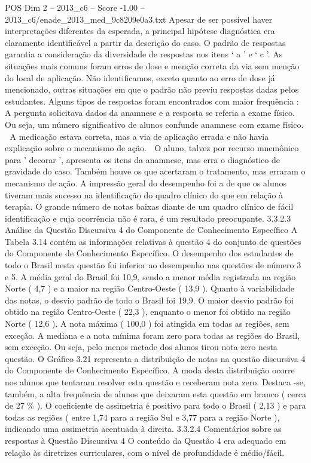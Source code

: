 \begin{textsample}{POS Dim 2 – 2013\_c6 – Score -1.00 – 2013\_c6/enade\_2013\_med\_9c8209e0a3.txt}
Apesar de ser possível haver interpretações diferentes da esperada, a principal hipótese diagnóstica era claramente identificável a partir da descrição do caso.
O padrão de respostas garantia a consideração da diversidade de respostas nos itens ‘ a ’ e ‘ c ’.
As situações mais comuns foram erros de dose e menção correta da via sem menção do local de aplicação.
Não identificamos, exceto quanto ao erro de dose já mencionado, outras situações em que o padrão não previu respostas dadas pelos estudantes.
Alguns tipos de respostas foram encontrados com maior frequência :  A pergunta solicitava dados da anamnese e a resposta se referia a exame físico.
Ou seja, um número significativo de alunos confunde anamnese com exame físico.  A medicação estava correta, mas a via de aplicação errada e não havia explicação sobre o mecanismo de ação.  O aluno, talvez por recurso mnemônico para ' decorar ', apresenta os itens da anamnese, mas erra o diagnóstico de gravidade do caso.
Também houve os que acertaram o tratamento, mas erraram o mecanismo de ação.
A impressão geral do desempenho foi a de que os alunos tiveram mais sucesso na identificação do quadro clínico do que em relação à terapia.
O grande número de notas baixas diante de um quadro clínico de fácil identificação e cuja ocorrência não é rara, é um resultado preocupante. 3.3.2.3 Análise da Questão Discursiva 4 do Componente de Conhecimento Específico A Tabela 3.14 contém as informações relativas à questão 4 do conjunto de questões do Componente de Conhecimento Específico.
O desempenho dos estudantes de todo o Brasil nesta questão foi inferior ao desempenho nas questões de número 3 e 5.
A média geral do Brasil foi 10,9, sendo a menor média registrada na região Norte ( 4,7 ) e a maior na região Centro-Oeste ( 13,9 ).
Quanto à variabilidade das notas, o desvio padrão de todo o Brasil foi 19,9.
O maior desvio padrão foi obtido na região Centro-Oeste ( 22,3 ), enquanto o menor foi obtido na região Norte ( 12,6 ).
A nota máxima ( 100,0 ) foi atingida em todas as regiões, sem exceção.
A mediana e a nota mínima foram zero para todas as regiões do Brasil, sem exceção.
Ou seja, pelo menos metade dos alunos tirou nota zero nesta questão.
O Gráfico 3.21 representa a distribuição de notas na questão discursiva 4 do Componente de Conhecimento Específico.
A moda desta distribuição ocorre nos alunos que tentaram resolver esta questão e receberam nota zero.
Destaca -se, também, a alta frequência de alunos que deixaram esta questão em branco ( cerca de 27 \% ).
O coeficiente de assimetria é positivo para todo o Brasil ( 2,13 ) e para todas as regiões ( entre 1,74 para a região Sul e 3,77 para a região Norte ), indicando uma assimetria acentuada à direita. 3.3.2.4 Comentários sobre as respostas à Questão Discursiva 4 O conteúdo da Questão 4 era adequado em relação às diretrizes curriculares, com o nível de profundidade é médio/fácil.

\end{textsample}
